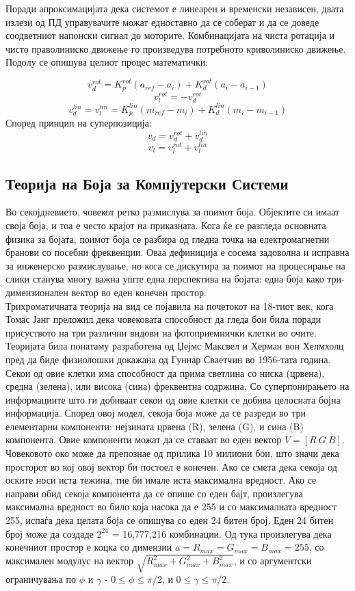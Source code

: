 \documentclass[12pt]{article}
\begin{document}
      Поради апроксимацијата дека системот е линеарен и временски независен, двата излези од ПД управувачите можат едноставно да се соберат и да се доведе соодветниот напонски сигнал до моторите. Комбинацијата на чиста ротација и чисто праволиниско движење го произведува потребното криволиниско движење. Подолу се опишува целиот процес математички:

      $$      v_d^{rot} = K_p^{rot}(a_{ref} - a_i) + K_d^{rot}(a_i - a_{i-1}) $$
      $$      v_l^{rot} = -v_d^{rot}  $$
      $$      v_d^{lin} = v_l^{lin} = K_p^{lin}(m_{ref} - m_i) + K_d^{lin}(m_i - m_{i-1}) $$
      Според принцип на суперпозиција:
      $$      v_d = v_d^{rot} + v_d^{lin} $$
      $$      v_l = v_l^{rot} + v_l^{lin} $$

  \subsection{Теорија на Боја за Компјутерски Системи}
  \label{sec:colour_theory}
    Во секојдневието, човекот ретко размислува за поимот боја. Објектите си имаат своја боја, и тоа е често крајот на приказната. Кога ќе се разгледа основната физика за бојата, поимот боја се разбира од гледна точка на електромагнетни бранови со посебни фреквенции. Оваа дефиниција е сосема задоволна и исправна за инженерско размислување, но кога се дискутира за поимот на процесирање на слики станува многу важна уште една перспектива на бојата: една боја како три-димензионален вектор во еден конечен простор.
    \\
    Трихроматичната теорија на вид се појавила на почетокот на 18-тиот век, кога Томас Јанг преложил дека човековата способност да гледа бои била поради присуството на три различни видови на фотоприемнички клетки во очите. Теоријата била понатаму разработена од Џејмс Максвел и Херман вон Хелмхолц пред да биде физиолошки докажана од Гуннар Сваетчин во 1956-тата година.
    \bigbreak
    Секои од овие клетки има способност да прима светлина со ниска (црвена), средна (зелена), или висока (сина) фреквентна содржина. Со суперпонирањето на информациите што ги добиваат секои од овие клетки се добива целосната бојна информација. Според овој модел, секоја боја може да се разреди во три елементарни компоненти: нејзината црвена (R), зелена (G), и сина (B) компонента. Овие компоненти можат да се ставаат во еден вектор $ V = [R\ G\ B]$. Човековото око може да препознае од прилика 10 милиони бои, што значи дека просторот во кој овој вектор би постоел е конечен. Ако се смета дека секоја од оските носи иста тежина, тие би имале иста максимална вредност. Ако се направи обид секоја компонента да се опише со еден бајт, произлегува максимална вредност во било која насока да е 255 и со максималната вредност 255, испаѓа дека целата боја се опишува со еден 24 битен број. Еден 24 битен број може да создаде $2^{24}$ = 16,777,216 комбинации. Од тука произлегува дека конечниот простор е коцка со димензии $a = R_{max} = G_{max} = B_{max} = 255 $, со максимален модулус на вектор $\sqrt{R_{max}^2 + G_{max}^2 + B_{max}^2}$, и со аргументски ограничувања по $\phi$ и $\gamma$ - $0 \leq \phi \leq \pi /2$, и $0 \leq \gamma \leq \pi /2$.
\end{document}
